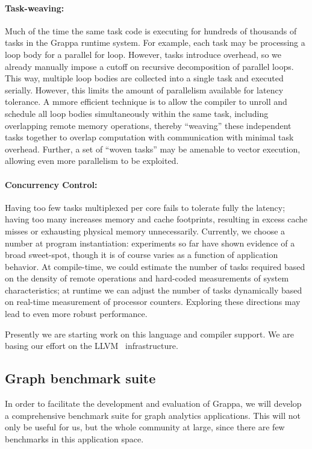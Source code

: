 \paragraph{Task-weaving: } Much of the time the same task code is executing for hundreds of thousands of tasks in the Grappa runtime system.  For example, each task may be processing a loop body for a parallel for loop.  However, tasks introduce overhead, so we already manually impose a cutoff on recursive decomposition of parallel loops.  This way, multiple loop bodies are collected into a single task and executed serially.  However, this limits the amount of parallelism available for latency tolerance. A mmore efficient technique is to allow the compiler to unroll and schedule all loop bodies simultaneously within the same task, including overlapping remote memory operations, thereby ``weaving'' these independent tasks together to overlap computation with communication with minimal task overhead.  Further, a set of ``woven tasks'' may be amenable to vector execution, allowing even more parallelism to be exploited.

\paragraph{Concurrency Control: } Having too few tasks multiplexed per core fails to tolerate fully the latency; having too many increases memory and cache footprints, resulting in excess cache misses or exhausting physical memory unnecessarily.  Currently, we choose a number at program instantiation:  experiments so far have shown evidence of a broad sweet-spot, though it is of course varies as a function of application behavior.  At compile-time, we could estimate the number of tasks required based on the density of remote operations and hard-coded measurements of system characteristics; at runtime we can adjust the number of tasks dynamically based on real-time measurement of processor counters.  Exploring these directions may lead to even more robust performance.

Presently we are starting work on this language and compiler support.  We are basing our effort on the LLVM~\cite{llvm} infrastructure.


\subsection{Graph benchmark suite}

In order to facilitate the development and evaluation of Grappa, we will develop a comprehensive benchmark suite for graph analytics applications. This will not only be useful for us, but the whole community at large, since there are few benchmarks in this application space.

